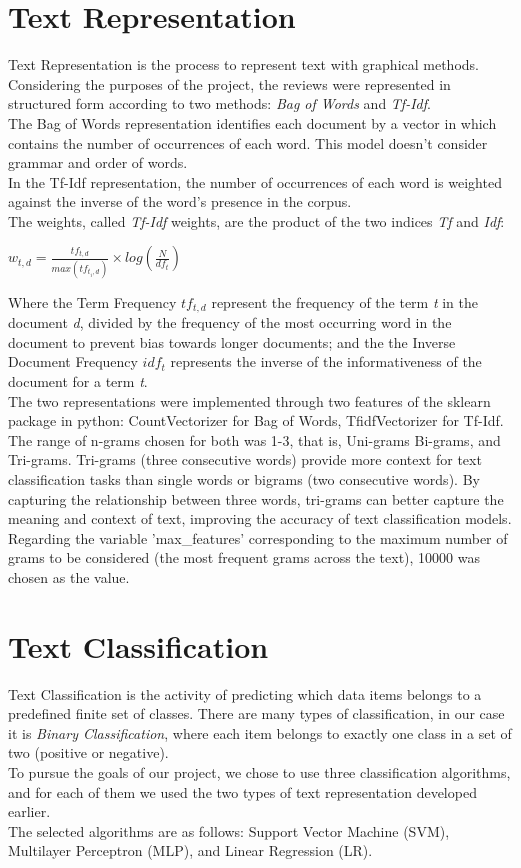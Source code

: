 \documentclass[fleqn,10pt]{SelfArx} %
\begin{document}
\section{Text Representation}
Text Representation is the process to represent text with graphical methods. Considering the purposes of the project, the reviews were represented in structured form according to two methods: \textit{Bag of Words} and \textit{Tf-Idf}.\\
The Bag of Words representation identifies each document by a vector in which contains the number of occurrences of each word. This model doesn't consider grammar and order of words.\\
In the Tf-Idf representation, the number of occurrences of each word is weighted against the inverse of the word's presence in the corpus.\\
The weights, called \textit{Tf-Idf} weights, are the product of the two indices \textit{Tf} and \textit{Idf}:
\begin{center}
$w_{t,d} = \frac{tf_{t,d}}{max (tf_{t_i,d})} \times log(\frac{N}{df_t})$
\end{center}
Where the Term Frequency \textit{$tf_{t,d}$} represent the frequency of the term \textit{t} in the document \textit{d}, divided by the frequency of the most occurring word in the document to prevent bias towards longer documents; and the the Inverse Document Frequency \textit{$idf_t$} represents the inverse of the informativeness of the document for a term \textit{t}.\\
The two representations were implemented through two features of the sklearn package in python: CountVectorizer for Bag of Words, TfidfVectorizer for Tf-Idf. The range of n-grams chosen for both was 1-3, that is, Uni-grams Bi-grams, and Tri-grams. Tri-grams (three consecutive words) provide more context for text classification tasks than single words or bigrams (two consecutive words). By capturing the relationship between three words, tri-grams can better capture the meaning and context of text, improving the accuracy of text classification models.\\
Regarding the variable 'max\_features' corresponding to the maximum number of grams to be considered (the most frequent grams across the text), 10000 was chosen as the value.

\section{Text Classification}
Text Classification is the activity of predicting which data items belongs to a predefined finite set of classes. There are many types of classification, in our case it is \textit{Binary Classification}, where each item belongs to exactly one class in a set of two (positive or negative).\\
To pursue the goals of our project, we chose to use three classification algorithms, and for each of them we used the two types of text representation developed earlier.\\
The selected algorithms are as follows: Support Vector Machine (SVM), Multilayer Perceptron (MLP), and Linear Regression (LR).
\end{document}
